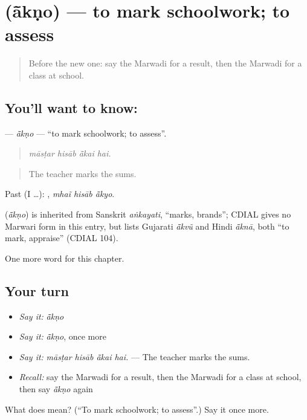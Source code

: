 \section[\texorpdfstring{\mw{आंकणो} (ā̃kṇo)}{आंकणो (ā̃kṇo)}]{ (ā̃kṇo) — to mark schoolwork; to assess}

\label{lesson:MW-C286-akno}



\begin{quote}
Before the new one: say the Marwadi for a result, then the Marwadi for a class at school.
\end{quote}

\subsection*{You'll want to know: }
\textbf{} — \emph{ā̃kṇo} — \textquotedblleft{}to mark schoolwork; to assess\textquotedblright{}.

\begin{quote}
   
\end{quote}

\begin{quote}
\emph{māsṭar hisāb ā̃kai hai.}
\end{quote}

\begin{quote}
The teacher marks the sums.
\end{quote}

Past (I …):   , \emph{mhaĩ hisāb ā̃kyo}.

\begin{cousinweb}
\textbf{} (\emph{ā̃kṇo}) is inherited from Sanskrit \emph{aṅkayati}, \textquotedblleft{}marks, brands\textquotedblright{}; CDIAL gives no Marwari form in this entry, but lists Gujarati \emph{ā̃kvũ} and Hindi \emph{ā̃knā}, both \textquotedblleft{}to mark, appraise\textquotedblright{} (CDIAL 104).
\end{cousinweb}

\begin{grammarlens}[title={What you've built}]
One more word for this chapter.
\end{grammarlens}

\subsection*{Your turn}
\begin{itemize}
\raggedright
  \item \emph{Say it:} \emph{ā̃kṇo}
  \item \emph{Say it:} \emph{ā̃kṇo}, once more
  \item \emph{Say it:} \emph{māsṭar hisāb ā̃kai hai.} — The teacher marks the sums.
  \item \emph{Recall:} say the Marwadi for a result, then the Marwadi for a class at school, then say \emph{ā̃kṇo} again
\end{itemize}

\begin{tcolorbox}[breakable,colback=teal!4,colframe=teal!35!black,title={Before you move on}]
What does  mean? (\textquotedblleft{}To mark schoolwork; to assess\textquotedblright{}.) Say it once more.
\end{tcolorbox}
